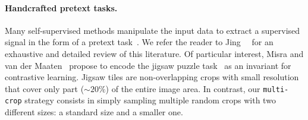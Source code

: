 \paragraph{Handcrafted pretext tasks.}
Many self-supervised methods manipulate the input data to extract a supervised signal in the form of a pretext task~\cite{doersch2015unsupervised,agrawal2015learning,jenni2018self,kim2018learning,larsson2016learning,mahendran2018cross,misra2016shuffle,pathak2017learning,pathak2016context,wang2015unsupervised,wang2017transitive,zhang2017split}.
We refer the reader to Jing~\etal~\cite{jing2019self} for an exhaustive and detailed review of this literature.
Of particular interest, Misra and van der Maaten~\cite{misra2019self} propose to encode the jigsaw puzzle task~\cite{noroozi2016unsupervised} as an invariant for contrastive learning.
Jigsaw tiles are non-overlapping crops with small resolution that cover only part (${\sim}20\%$) of the entire image area.
In contrast, our \texttt{multi-crop} strategy consists in simply sampling multiple random crops with two different sizes: a standard size and a smaller one.

